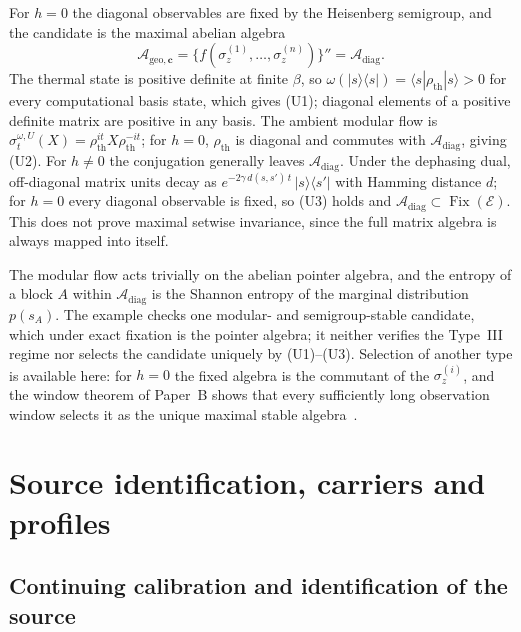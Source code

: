 For $h=0$ the diagonal observables are fixed by the Heisenberg semigroup, and the candidate is the maximal abelian algebra
\begin{equation}
\mathcal{A}_{\mathrm{geo},\mathbf{c}} = \{f(\sigma_z^{(1)}, \ldots, \sigma_z^{(n)})\}'' = \mathcal{A}_{\mathrm{diag}}.
\end{equation}
The thermal state is positive definite at finite $\beta$, so $\omega(|s\rangle\langle s|) = \langle s | \rho_{\mathrm{th}} | s \rangle > 0$ for every computational basis state, which gives (U1); diagonal elements of a positive definite matrix are positive in any basis. The ambient modular flow is $\sigma_t^{\omega,U}(X) = \rho_{\mathrm{th}}^{it} X \rho_{\mathrm{th}}^{-it}$; for $h=0$, $\rho_{\mathrm{th}}$ is diagonal and commutes with $\mathcal A_{\mathrm{diag}}$, giving (U2). For $h\ne0$ the conjugation generally leaves $\mathcal A_{\mathrm{diag}}$. Under the dephasing dual, off-diagonal matrix units decay as $e^{-2\gamma\, d(s,s')\, t}\, |s\rangle\langle s'|$ with Hamming distance $d$; for $h=0$ every diagonal observable is fixed, so (U3) holds and $\mathcal A_{\mathrm{diag}}\subset\operatorname{Fix}(\mathcal E)$. This does not prove maximal setwise invariance, since the full matrix algebra is always mapped into itself.

The modular flow acts trivially on the abelian pointer algebra, and the entropy of a block $A$ within $\mathcal{A}_{\mathrm{diag}}$ is the Shannon entropy of the marginal distribution $p(s_A)$. The example checks one modular- and semigroup-stable candidate, which under exact fixation is the pointer algebra; it neither verifies the Type~III regime nor selects the candidate uniquely by (U1)--(U3). Selection of another type is available here: for $h=0$ the fixed algebra is the commutant of the $\sigma_z^{(i)}$, and the window theorem of Paper~B shows that every sufficiently long observation window selects it as the unique maximal stable algebra~\cite{Liu2026PaperB}.


\section{Source identification, carriers and profiles}
\label{app:source-details}

\subsection{Continuing calibration and identification of the source}
\label{sec:source-identification}

